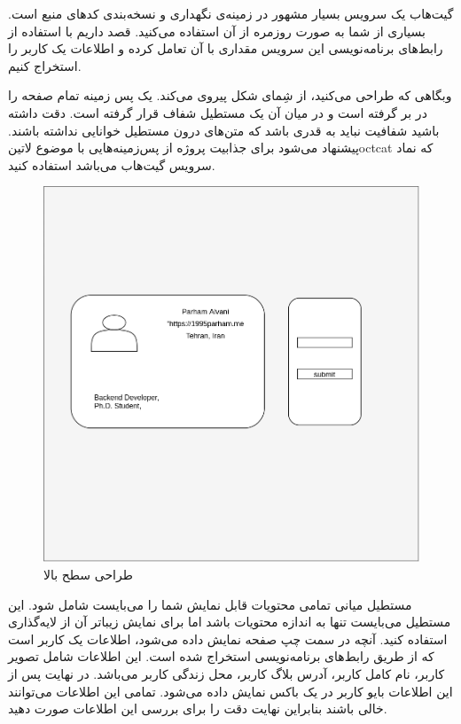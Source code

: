 

گیت‌هاب یک سرویس بسیار مشهور در زمینه‌ی نگهداری و نسخه‌بندی کدهای منبع است. بسیاری از شما به صورت روزمره از آن استفاده می‌کنید.
قصد داریم با استفاده از رابط‌های برنامه‌نویسی این سرویس مقداری با آن تعامل کرده و اطلاعات یک کاربر را استخراج کنیم.


وبگاهی که طراحی می‌کنید، از شِمای شکل  پیروی می‌کند. یک پس زمینه تمام صفحه را در بر گرفته است و در میان آن یک مستطیل شفاف قرار گرفته است.
دقت داشته باشید شفافیت نباید به قدری باشد که متن‌های درون مستطیل خوانایی نداشته باشند.
پیشنهاد می‌شود برای جذابیت پروژه از پس‌زمینه‌هایی با موضوع ‌لاتین{octcat} که نماد سرویس گیت‌هاب می‌باشد استفاده کنید.

\begin{figure}[h]
  \centering
  \includegraphics[scale=0.25]{./github/github.png}
  \caption{طراحی سطح بالا}
  \label{fig:high-level-design}
\end{figure}

مستطیل میانی تمامی محتویات قابل نمایش شما را می‌بایست شامل شود. این مستطیل می‌بایست تنها به اندازه محتویات باشد اما برای نمایش زیباتر آن از لایه‌گذاری استفاده کنید.
آنچه در سمت چپ صفحه نمایش داده می‌شود، اطلاعات یک کاربر است که از طریق رابط‌های برنامه‌نویسی استخراج شده است. این اطلاعات شامل تصویر کاربر،
نام کامل کاربر، آدرس بلاگ کاربر، محل زندگی کاربر می‌باشد.
در نهایت پس از این اطلاعات بایو کاربر در یک باکس نمایش داده می‌شود.
تمامی این اطلاعات می‌توانند خالی باشند بنابراین نهایت دقت را برای بررسی این اطلاعات صورت دهید.

